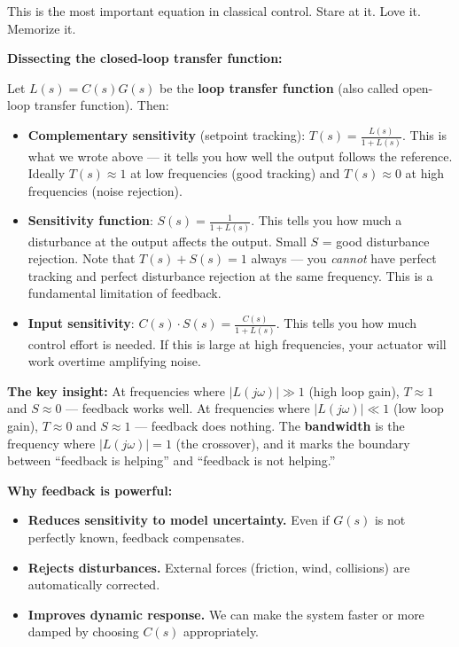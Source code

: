 This is the most important equation in classical control. Stare at it. Love it. Memorize it.

\textbf{Dissecting the closed-loop transfer function:}

Let $L(s) = C(s)G(s)$ be the \textbf{loop transfer function} (also called open-loop transfer function). Then:

\begin{itemize}
    \item \textbf{Complementary sensitivity} (setpoint tracking): $T(s) = \frac{L(s)}{1 + L(s)}$. This is what we wrote above --- it tells you how well the output follows the reference. Ideally $T(s) \approx 1$ at low frequencies (good tracking) and $T(s) \approx 0$ at high frequencies (noise rejection).

    \item \textbf{Sensitivity function}: $S(s) = \frac{1}{1 + L(s)}$. This tells you how much a disturbance at the output affects the output. Small $S$ = good disturbance rejection. Note that $T(s) + S(s) = 1$ always --- you \textit{cannot} have perfect tracking and perfect disturbance rejection at the same frequency. This is a fundamental limitation of feedback.

    \item \textbf{Input sensitivity}: $C(s) \cdot S(s) = \frac{C(s)}{1 + L(s)}$. This tells you how much control effort is needed. If this is large at high frequencies, your actuator will work overtime amplifying noise.
\end{itemize}

\textbf{The key insight:} At frequencies where $|L(j\omega)| \gg 1$ (high loop gain), $T \approx 1$ and $S \approx 0$ --- feedback works well. At frequencies where $|L(j\omega)| \ll 1$ (low loop gain), $T \approx 0$ and $S \approx 1$ --- feedback does nothing. The \textbf{bandwidth} is the frequency where $|L(j\omega)| = 1$ (the crossover), and it marks the boundary between ``feedback is helping'' and ``feedback is not helping.''

\textbf{Why feedback is powerful:}
\begin{itemize}
    \item \textbf{Reduces sensitivity to model uncertainty.} Even if $G(s)$ is not perfectly known, feedback compensates.
    \item \textbf{Rejects disturbances.} External forces (friction, wind, collisions) are automatically corrected.
    \item \textbf{Improves dynamic response.} We can make the system faster or more damped by choosing $C(s)$ appropriately.
\end{itemize}

